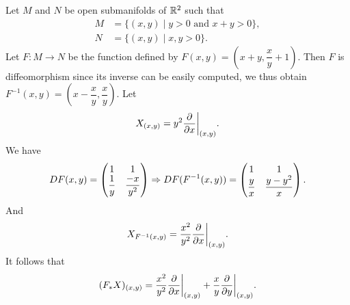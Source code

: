 \begin{example}
    Let $M$ and $N$ be open submanifolds of $\mathbb{R}^2$ such that 
    \begin{align*}
        M &= \{(x,y) \mid y > 0 \text{ and }x + y > 0\},\\
        N &= \{(x,y) \mid x,y > 0\}.
    \end{align*}
    Let $F: M \to N$ be the function defined by $F(x,y) = \left(x + y, \dfrac{x}{y} + 1\right)$. Then $F$ is diffeomorphism since its inverse can be easily computed, we thus obtain $F^{-1}(x,y) = \left(x - \dfrac{x}{y}, \dfrac{x}{y}\right)$. Let 
    \[
        X_{(x,y)} = y^2 \frac{\partial}{\partial x}\bigg|_{(x,y)}.
    \]
    We have 
    \[
        DF(x,y) = \begin{pmatrix}
                1 & 1\\
                \dfrac{1}{y} & \dfrac{-x}{y^2}
        \end{pmatrix} \Rightarrow DF(F^{-1}(x,y)) = \begin{pmatrix}
            1 & 1\\
            \dfrac{y}{x} & \dfrac{y - y^2}{x}
        \end{pmatrix}.
    \]
    And 
    \[
        X_{F^{-1}(x,y)} = \frac{x^2}{y^2}\frac{\partial}{\partial x}\bigg|_{(x,y)}.
    \]
    It follows that 
    \[
        (F_*X)_{(x,y)} = \frac{x^2}{y^2}\frac{\partial}{\partial x}\bigg|_{(x,y)} + \frac{x}{y}\frac{\partial}{\partial y}\bigg|_{(x,y)}.
    \]
\end{example}
